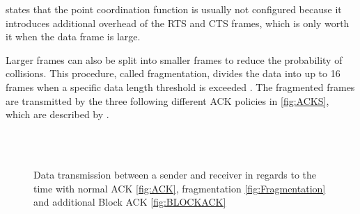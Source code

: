 \textcite{sauter_wireless_2022} states that the point coordination function is usually not configured because it introduces additional
overhead of the \ac{RTS} and \ac{CTS} frames, which is only worth it when the data frame is large.

Larger frames can also be split into smaller frames to reduce the probability of collisions.
This procedure, called fragmentation, divides the data into up to \num{16} frames
when a specific data length threshold is exceeded \cite{ieee_standard_2009n}.
The fragmented frames are transmitted by the three following different \ac{ACK} policies in \autoref{fig:ACKS}, which are described by \textcite{sauter_wireless_2022}.

\begin{figure}%
    \centering
    \\
    \\
    \caption{Data transmission between a sender and receiver in regards to the time with normal \acf{ACK} \autoref{fig:ACK},
    fragmentation \autoref{fig:Fragmentation} and additional Block \ac{ACK} \autoref{fig:BLOCKACK}}%
    \label{fig:ACKS}%
\end{figure}

